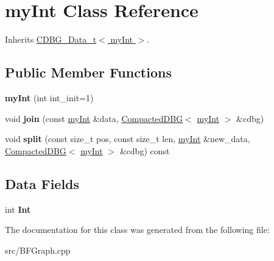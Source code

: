 \hypertarget{classmyInt}{}\section{my\+Int Class Reference}
\label{classmyInt}


Inherits \hyperlink{classCDBG__Data__t}{C\+D\+B\+G\+\_\+\+Data\+\_\+t$<$ my\+Int $>$}.

\subsection*{Public Member Functions}
\begin{DoxyCompactItemize}
\item 
\mbox{\label{classmyInt_a5662c044c5436f29590bfcd9b60c86df}} 
{\bfseries my\+Int} (int int\+\_\+init=1)
\item 
\mbox{\label{classmyInt_a998ce36cd657ba8eb1af6a2ae31215e0}} 
void {\bfseries join} (const \hyperlink{classmyInt}{my\+Int} \&data, \hyperlink{classCompactedDBG}{Compacted\+D\+BG}$<$ \hyperlink{classmyInt}{my\+Int} $>$ \&cdbg)
\item 
\mbox{\label{classmyInt_aa68c3e466e82439793c0dd72cedb161f}} 
void {\bfseries split} (const size\+\_\+t pos, const size\+\_\+t len, \hyperlink{classmyInt}{my\+Int} \&new\+\_\+data, \hyperlink{classCompactedDBG}{Compacted\+D\+BG}$<$ \hyperlink{classmyInt}{my\+Int} $>$ \&cdbg) const
\end{DoxyCompactItemize}
\subsection*{Data Fields}
\begin{DoxyCompactItemize}
\item 
\mbox{\label{classmyInt_af52aada8ff232869cbb9f669cc0f7e42}} 
int {\bfseries Int}
\end{DoxyCompactItemize}


The documentation for this class was generated from the following file\+:\begin{DoxyCompactItemize}
\item 
src/B\+F\+Graph.\+cpp\end{DoxyCompactItemize}
